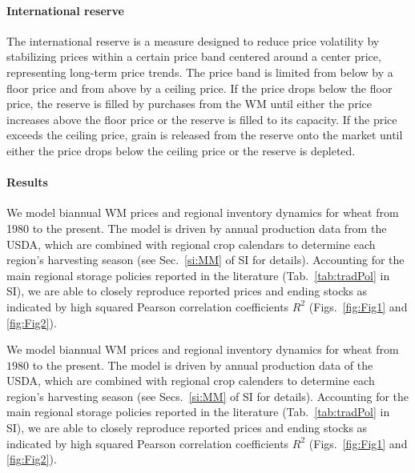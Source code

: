 \documentclass[12pt]{article}
\begin{document}
\paragraph*{International reserve}
\label{sec:int_reserve}
The international reserve is a measure designed to reduce price volatility by stabilizing prices within a certain price band centered around a center price, representing long-term price trends. The price band is limited from below by a floor price and from above by a ceiling price. If the price drops below the floor price, the reserve is filled by purchases from the WM until either the price increases above the floor price or the reserve is filled to its capacity. If the price exceeds the ceiling price, grain is released from the reserve onto the market until either the price drops below the ceiling price or the reserve is depleted.

\paragraph*{Results}
We model biannual WM prices and regional inventory dynamics for wheat from 1980 to the present. The model is driven by annual production data from the USDA, which are combined with regional crop calendars to determine each region's harvesting season (see Sec.~\ref{si:MM} of SI for details). Accounting for the main regional storage policies reported in the literature (Tab.~\ref{tab:tradPol} in SI), we are able to closely reproduce reported prices and ending stocks as indicated by high squared Pearson correlation coefficients $R^2$ (Figs.~\ref{fig:Fig1} and \ref{fig:Fig2}).

We model biannual WM prices and regional inventory dynamics for wheat from $1980$ to the
present. The model is driven by annual production data of the USDA, which are combined with regional
crop calenders to determine each region's harvesting season (see Secs.~\ref{si:MM} of SI for details). Accounting for the main regional storage policies reported in
the literature (Tab.~\ref{tab:tradPol} in SI), we are able to closely reproduce reported prices and
ending stocks as indicated by high squared Pearson correlation coefficients $R^2$
(Figs.~\ref{fig:Fig1} and \ref{fig:Fig2}).
\end{document}

